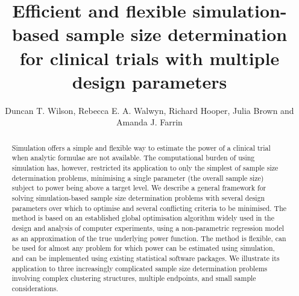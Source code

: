 \documentclass[sagev]{sagej}
\begin{document}

\title{Efficient and flexible simulation-based sample size determination for clinical trials with multiple design parameters}

\author{Duncan T. Wilson,
Rebecca E. A. Walwyn, 
Richard Hooper,
Julia Brown and 
Amanda J. Farrin}



\begin{abstract}

Simulation offers a simple and flexible way to estimate the power of a clinical trial when analytic formulae are not available. The computational burden of using simulation has, however, restricted its application to only the simplest of sample size determination problems, minimising a single parameter (the overall sample size) subject to power being above a target level. We describe a general framework for solving simulation-based sample size determination problems with several design parameters over which to optimise and several conflicting criteria to be minimised. The method is based on an established global optimisation algorithm widely used in the design and analysis of computer experiments, using a non-parametric regression model as an approximation of the true underlying power function. The method is flexible, can be used for almost any problem for which power can be estimated using simulation, and can be implemented using existing statistical software packages. We illustrate its application to three increasingly complicated sample size determination problems involving complex clustering structures, multiple endpoints, and small sample considerations.
\end{abstract}


\maketitle
\end{document}
